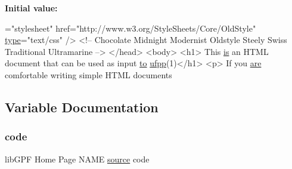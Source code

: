 {\bfseries Initial value\+:}
\begin{DoxyCode}
=\textcolor{stringliteral}{"stylesheet"} href=\textcolor{stringliteral}{"http://www.w3.org/StyleSheets/Core/OldStyle"} \hyperlink{create__watch_83_8txt_a6036c8b9d18bd95ef0feb888982faa0b}{type}=\textcolor{stringliteral}{"text/css"} />
           <!-- Chocolate Midnight Modernist Oldstyle Steely Swiss Traditional Ultramarine -->
        </head>
        <body>
        <h1> This \hyperlink{M__journal_83_8txt_af78cd777fb46433462e3afacb9c375fd}{is} an HTML document that can be used as input \hyperlink{M__stopwatch_83_8txt_a97209fd3e34ef701c0a9734280779cbb}{to} \hyperlink{ufpp__overview_81_8txt_a97c20a96bcab81bc74c9d64b001f1202}{ufpp}(1)</h1>
        <p>
            If you \hyperlink{M__stopwatch_83_8txt_a5040be02b832eba08820289c8a1f81c4}{are} comfortable writing simple HTML documents
\end{DoxyCode}


\subsection{Variable Documentation}
\mbox{\label{ufpp__overview_81_8txt_a74a0615f2d9c4a398d9126096f8092f8}} 
\subsubsection{\texorpdfstring{code}{code}}
{\footnotesize\ttfamily lib\+G\+PF Home Page N\+A\+ME \hyperlink{ufpp__overview_81_8txt_a4d6669ece605d05985c83a04dd38e0ad}{source} code}

\mbox{\label{ufpp__overview_81_8txt_a5673f2294ff1627be40c90eae33141ca}} 
